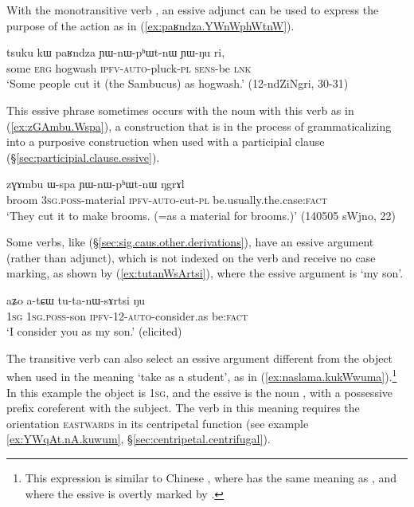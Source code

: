 With the monotransitive verb , an essive adjunct can be used to express the purpose of the action as in (\ref{ex:paʁndza.YWnWphWtnW}).  

\begin{exe}
\ex \label{ex:paʁndza.YWnWphWtnW} 
\gll tsuku kɯ paʁndza ɲɯ-nɯ-pʰɯt-nɯ ɲɯ-ŋu ri,  \\
some \textsc{erg} hogwash \textsc{ipfv}-\textsc{auto}-pluck-\textsc{pl} \textsc{sens}-be \textsc{lnk}   \\
\glt `Some people cut it (the Sambucus) as hogwash.' (12-ndZiNgri, 30-31)
\end{exe}

This essive phrase sometimes occurs with the noun  with this verb as in (\ref{ex:zGAmbu.Wspa}), a construction that is in the process of grammaticalizing into a purposive construction when used with a participial clause (§\ref{sec:participial.clause.essive}).  
 
\begin{exe}
\ex \label{ex:zGAmbu.Wspa}
\gll  zɣɤmbu ɯ-spa ɲɯ-nɯ-pʰɯt-nɯ ŋgrɤl  \\
broom \textsc{3sg}.\textsc{poss}-material \textsc{ipfv}-\textsc{auto}-cut-\textsc{pl} be.usually.the.case:\textsc{fact} \\
\glt `They cut it to make brooms. (=as a material for brooms.)' (140505 sWjno, 22)
\end{exe}

Some verbs, like  (§\ref{sec:sig.caus.other.derivations}), have an essive argument (rather than adjunct), which is not indexed on the verb and receive no case marking, as shown by  (\ref{ex:tutanWsArtsi}), where the essive argument is  `my son'.

\begin{exe}
\ex \label{ex:tutanWsArtsi}
 \gll aʑo a-tɕɯ tu-ta-nɯ-sɤrtsi ŋu \\
 \textsc{1sg} \textsc{1sg}.\textsc{poss}-son \textsc{ipfv}-1\fl{}2-\textsc{auto}-consider.as be:\textsc{fact} \\
 \glt `I consider you as my son.' (elicited)
\end{exe}


The transitive verb  can also select an essive argument different from the object when used in the meaning `take as a student', as in (\ref{ex:naslama.kukWwuma}).\footnote{This expression is similar to Chinese , where   has the same meaning as , and where the essive is overtly marked by  . } In this example the object is \textsc{1sg}, and the essive is the noun , with a possessive prefix coreferent with the subject. The verb  in this meaning requires the orientation \textsc{eastwards} in its centripetal function (see example \ref{ex:YWqAt.nA.kuwum}, §\ref{sec:centripetal.centrifugal}).

